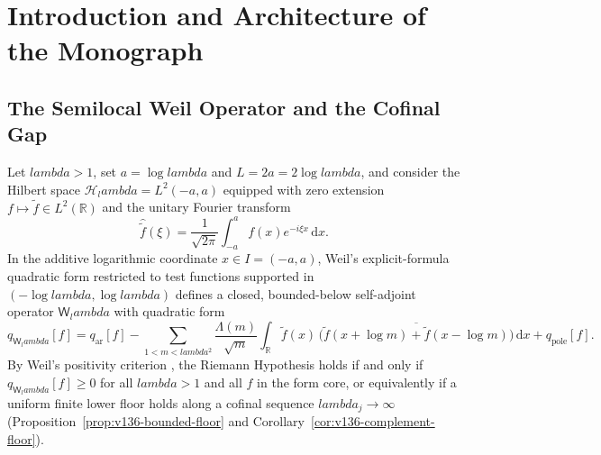 \documentclass[11pt]{article}
\def\lambda{lambda}%
\theoremstyle{remark}
\newcommand{\dd}{\mathrm d}
\begin{document}
\begin{abstract}
(); and Nyman--Beurling / B\'aez-Duarte canonical sharp-cutoff, same-Gram unitary atom-transformation countermodel $\sigma_n^{(\beta)}=U_\beta\sigma_n$ with floor $F_\beta=(2\beta-1)(1-\beta)^2/\beta^6>0$ (\texttt{NS-74}), and critical-zero $\liminf_{N\to\infty}(\log N)E_N^{(q)}\ge \sum_{\rho\in\mathcal Z_c} m_\rho^2/|\rho|^{2q}$ decay-floor obstructions (\texttt{NS-83}). All fixed-window and obstruction results are unconditional theorems; the cofinal uniform positivity margin (\texttt{WEIL-FLOOR} / Goal G2), nonsummable dyadic gain (\texttt{NB-GAIN}), and the Riemann Hypothesis remain open.
\end{abstract}

\tableofcontents
\newpage

\section{Introduction and Architecture of the Monograph}\label{sec:intro}

\subsection{The Semilocal Weil Operator and the Cofinal Gap}
Let $\lambda>1$, set $a=\log\lambda$ and $L=2a=2\log\lambda$, and consider the Hilbert space $\mathcal H_\lambda = L^2(-a,a)$ equipped with zero extension $f\mapsto \widetilde f\in L^2(\mathbb R)$ and the unitary Fourier transform
\[
 \widehat{\widetilde f}(\xi) = \frac{1}{\sqrt{2\pi}}\int_{-a}^{a} f(x)e^{-i\xi x}\,\dd x.
\]
In the additive logarithmic coordinate $x\in I=(-a,a)$, Weil's explicit-formula quadratic form restricted to test functions supported in $(-\log\lambda,\log\lambda)$ defines a closed, bounded-below self-adjoint operator $\mathsf W_\lambda$ with quadratic form
\begin{equation}\label{eq:intro-weil-form}
 q_{\mathsf W_\lambda}[f] = q_{\mathrm{ar}}[f] - \sum_{1<m<\lambda^2}\frac{\Lambda(m)}{\sqrt m}\int_{\mathbb R}\widetilde f(x)\,\overline{\bigl(\widetilde f(x+\log m)+\widetilde f(x-\log m)\bigr)}\,\dd x + q_{\mathrm{pole}}[f].
\end{equation}
By Weil's positivity criterion \cite{BurnolExplicit2000,ConnesConsaniMoscovici2025}, the Riemann Hypothesis holds if and only if $q_{\mathsf W_\lambda}[f]\ge 0$ for all $\lambda>1$ and all $f$ in the form core, or equivalently if a uniform finite lower floor holds along a cofinal sequence $\lambda_j\to\infty$ (Proposition~\ref{prop:v136-bounded-floor} and Corollary~\ref{cor:v136-complement-floor}).
\end{document}
